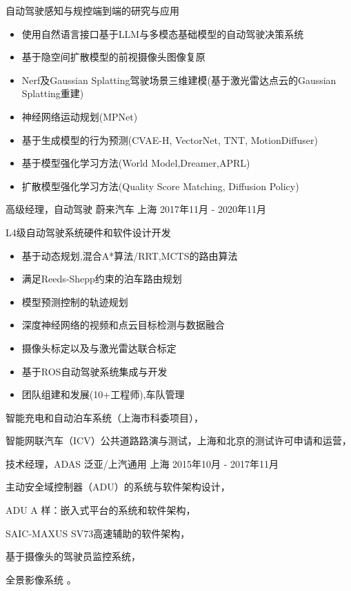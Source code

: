 \documentclass[../cv_cn.tex]{subfiles}
\begin{document}
\begin{cventries}
{\begin{cvitems}
\begin{itemize}
			\end{itemize}
			\item 自动驾驶感知与规控端到端的研究与应用
			\begin{itemize}
				\item 使用自然语言接口基于LLM与多模态基础模型的自动驾驶决策系统 \supercite{Xin_LLM_24} \supercite{Xin_VLM_24}
				\item 基于隐空间扩散模型的前视摄像头图像复原\supercite{Xin_Latent_Diffusion_23}
				\item Nerf及Gaussian Splatting驾驶场景三维建模(基于激光雷达点云的Gaussian Splatting重建)
				\item 神经网络运动规划(MPNet)
				\item 基于生成模型的行为预测(CVAE-H, VectorNet, TNT, MotionDiffuser)
				\item 基于模型强化学习方法(World Model,Dreamer,APRL)
				\item 扩散模型强化学习方法(Quality Score Matching, Diffusion Policy)
			\end{itemize}
		\end{cvitems}
	}

	\cventry
	{高级经理，自动驾驶} %
	{蔚来汽车} %
	{上海} %
	{2017年11月 - 2020年11月} %
	{
		\begin{cvitems}
			\item L4级自动驾驶系统硬件和软件设计开发
			\begin{itemize}
				\item 基于动态规划,混合A*算法/RRT,MCTS的路由算法
				\item 满足Reeds-Shepp约束的泊车路由规划
				\item 模型预测控制的轨迹规划
				\item 深度神经网络的视频和点云目标检测与数据融合
				\item 摄像头标定以及与激光雷达联合标定
				\item 基于ROS自动驾驶系统集成与开发
				\item 团队组建和发展(10+工程师),车队管理
			\end{itemize}
			\item 智能充电和自动泊车系统（上海市科委项目），
			\item 智能网联汽车（ICV）公共道路路演与测试，上海和北京的测试许可申请和运营，
		\end{cvitems}
	}

	\cventry
	{技术经理，ADAS} %
	{泛亚/上汽通用} %
	{上海} %
	{2015年10月 - 2017年11月} %
	{
		\begin{cvitems}
			\item 主动安全域控制器（ADU）的系统与软件架构设计，
			\item ADU A 样：嵌入式平台的系统和软件架构，
			\item SAIC-MAXUS SV73高速辅助的软件架构，
			\item 基于摄像头的驾驶员监控系统，
			\item 全景影像系统 \supercite{Xin_RearView_17}。
		\end{cvitems}
	}



\end{cventries}
\end{document}
